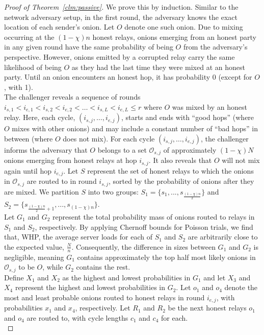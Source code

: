 \begin{proof} [Proof of Theorem~\ref{clm:passive}]

We prove this by induction. Similar to the network adversary setup, in the first round, the adversary knows the exact location of each sender’s onion. Let $O$ denote one such onion. Due to mixing occurring at the $(1 - \chi)n$ honest relays, onions emerging from an honest party in any given round have the same probability of being $O$ from the adversary's perspective. However, onions emitted by a corrupted relay carry the same likelihood of being $O$ as they had the last time they were mixed at an honest party. Until an onion encounters an honest hop, it has probability 0 (except for $O$, with 1).\\

The challenger reveals a sequence of rounds $i_{s, 1} < i_{e, 1} < i_{s, 2} < i_{e, 2} < \dots < i_{s, L} < i_{e, L} \le r$ where $O$ was mixed by an honest relay. Here, each cycle, $(i_{s, j}, \dots, i_{e, j})$, starts and ends with ``good hops'' (where $O$ mixes with other onions) and may include a constant number of “bad hops” in between (where $O$ does not mix). For each cycle $(i_{s, j}, \dots, i_{e, j})$, the challenger informs the adversary that $O$ belongs to a set $\mathcal{O}_{s, j}$ of approximately $(1 - \chi)N$ onions emerging from honest relays at hop $i_{s, j}$. It also reveals that $O$ will not mix again until hop $i_{e, j}$. Let $S$ represent the set of honest relays to which the onions in $\mathcal{O}_{s, j}$ are routed to in round $i_{s, j}$, sorted by the probability of onions after they are mixed. We partition $S$ into two groups: $S_1 = \{ s_1,..., s_{\frac{(1 - \chi)n}{2}} \}$ and $S_2 = \{ s_{\frac{(1 - \chi)n}{2} + 1},..., s_{(1 - \chi)n} \}$.\\

Let $G_1$ and $G_2$ represent the total probability mass of onions routed to relays in $S_1$ and $S_2$, respectively. By applying Chernoff bounds for Poisson trials, we find that, WHP, the average server loads for each of $S_1$ and $S_2$ are arbitrarily close to the expected value, $\frac{N}{n}$. Consequently, the difference in sizes between $G_1$ and $G_2$ is negligible, meaning $G_1$ contains approximately the top half most likely onions in $\mathcal{O}_{s, j}$ to be $O$, while $G_2$ contains the rest.\\

Define $X_1$ and $X_2$ as the highest and lowest probabilities in $G_1$ and let $X_3$ and $X_4$ represent the highest and lowest probabilities in $G_2$. Let $o_1$ and $o_4$ denote the most and least probable onions routed to honest relays in round $i_{e, j}$, with probabilities $x_1$ and $x_4$, respectively. Let $R_1$ and $R_2$ be the next honest relays $o_1$ and $o_4$ are routed to, with cycle lengths $c_1$ and $c_4$ for each. \\


\end{proof}
